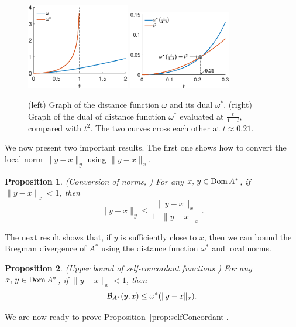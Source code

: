 \documentclass[twoside]{article}
\newtheorem{proposition}{Proposition}
\newcommand{\logpart}{A}
\newcommand{\bregmanconj}{\cB_{\logpart^*}}
\begin{document}
\begin{figure}[ht]
	\centering
	\includegraphics[width=0.4\textwidth]{figs/self_concordance/omega.eps}
	\includegraphics[width=0.4\textwidth]{figs/self_concordance/omega_star.eps}
	\caption{(left) Graph of the distance function $\omega$ and its dual $\omega^*$. (right) Graph of the dual of distance function $\omega^*$ evaluated at $\frac{t}{1-t}$, compared with $t^2$. The two curves cross each other at $t\approx 0.21$.}
	\label{fig:omega}
\end{figure}

We now present two important results. The first one shows how to convert the local norm $\|y-x\|_y$ using $\|y-x\|_x$.
\begin{proposition}\label{prop:conversion_norm}
	(Conversion of norms, \citep[Theorem 4.1.5]{nesterov2003introductory}) For any $x,\,y\in\operatorname{\mathrm{Dom}} A^*$, if $\|y-x\|_x<1$, then
	\[
		\|y-x\|_y \leq \frac{\|y-x\|_x}{1-\|y-x\|_x}.
	\]
\end{proposition}

The next result shows that, if $y$ is sufficiently close to $x$, then we can bound the Bregman divergence of $A^*$ using the distance function $\omega^*$ and local norms.
\begin{proposition}(Upper bound of self-concordant functions \citep[Theorem 4.1.8]{nesterov2003introductory}) \label{prop:upper_bound_self_concordance}
	For any $x,\,y\in\operatorname{\mathrm{Dom}} A^*$, if $\|y-x\|_x<1$, then
	\[
		\bregmanconj(y,x) \leq \omega^*(\|y-x\|_x).
	\]
\end{proposition}

We are now ready to prove Proposition~\ref{prop:selfConcordant}.
\end{document}
